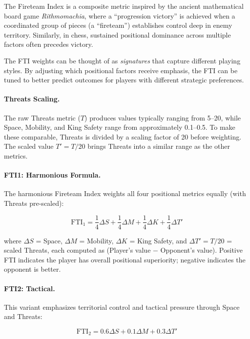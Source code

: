 \documentclass[11pt]{book}
\begin{document}
The Fireteam Index is a composite metric inspired by the ancient mathematical board game \textit{Rithmomachia}, where a ``progression victory'' is achieved when a coordinated group of pieces (a ``fireteam'') establishes control deep in enemy territory. Similarly, in chess, sustained positional dominance across multiple factors often precedes victory.

The FTI weights can be thought of as \emph{signatures} that capture different playing styles. By adjusting which positional factors receive emphasis, the FTI can be tuned to better predict outcomes for players with different strategic preferences.

\paragraph{Threats Scaling.} The raw Threats metric ($T$) produces values typically ranging from 5--20, while Space, Mobility, and King Safety range from approximately 0.1--0.5. To make these comparable, Threats is divided by a scaling factor of 20 before weighting. The scaled value $T' = T/20$ brings Threats into a similar range as the other metrics.

\paragraph{FTI1: Harmonious Formula.} The harmonious Fireteam Index weights all four positional metrics equally (with Threats pre-scaled):

\begin{equation}
\text{FTI}_1 = \frac{1}{4} \Delta S + \frac{1}{4} \Delta M + \frac{1}{4} \Delta K + \frac{1}{4} \Delta T'
\end{equation}

where $\Delta S$ = Space, $\Delta M$ = Mobility, $\Delta K$ = King Safety, and $\Delta T' = T/20$ = scaled Threats, each computed as (Player's value $-$ Opponent's value). Positive FTI indicates the player has overall positional superiority; negative indicates the opponent is better.

\paragraph{FTI2: Tactical.} This variant emphasizes territorial control and tactical pressure through Space and Threats:

\begin{equation}
\text{FTI}_2 = 0.6 \Delta S + 0.1 \Delta M + 0.3 \Delta T'
\end{equation}
\end{document}
